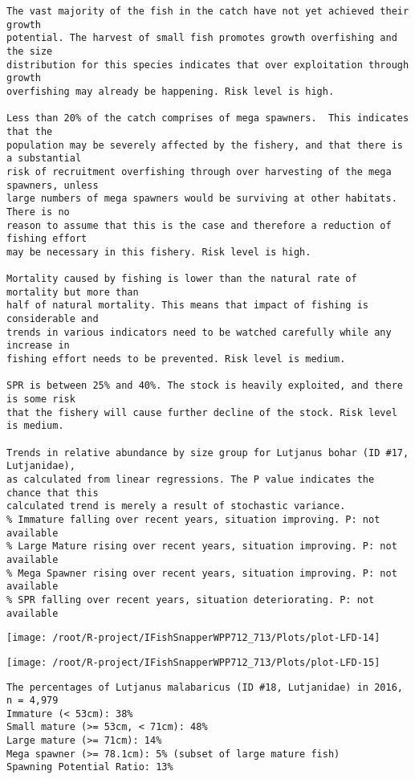 \documentclass{report}\usepackage[]{graphicx}\usepackage[]{color}
\makeatletter
\def\maxwidth{ %
  \ifdim\Gin@nat@width>\linewidth
    \linewidth
  \else
    \Gin@nat@width
  \fi
}
\newenvironment{kframe}{%
 \def\at@end@of@kframe{}%
 \ifinner\ifhmode%
  \def\at@end@of@kframe{\end{minipage}}%
  \begin{minipage}{\columnwidth}%
 \fi\fi%
 \def\FrameCommand##1{\hskip\@totalleftmargin \hskip-\fboxsep
 \colorbox{shadecolor}{##1}\hskip-\fboxsep
     \hskip-\linewidth \hskip-\@totalleftmargin \hskip\columnwidth}%
 \MakeFramed {\advance\hsize-\width
   \@totalleftmargin\z@ \linewidth\hsize
   \@setminipage}}%
 {\par\unskip\endMakeFramed%
 \at@end@of@kframe}
\newenvironment{knitrout}{}{} %
\makeatother
\begin{document}
\begin{knitrout}
\begin{kframe}
\begin{verbatim}
The vast majority of the fish in the catch have not yet achieved their growth
potential. The harvest of small fish promotes growth overfishing and the size
distribution for this species indicates that over exploitation through growth
overfishing may already be happening. Risk level is high.

Less than 20% of the catch comprises of mega spawners.  This indicates that the
population may be severely affected by the fishery, and that there is a substantial
risk of recruitment overfishing through over harvesting of the mega spawners, unless
large numbers of mega spawners would be surviving at other habitats. There is no
reason to assume that this is the case and therefore a reduction of fishing effort
may be necessary in this fishery. Risk level is high.
 
Mortality caused by fishing is lower than the natural rate of mortality but more than
half of natural mortality. This means that impact of fishing is considerable and
trends in various indicators need to be watched carefully while any increase in
fishing effort needs to be prevented. Risk level is medium.
 
SPR is between 25% and 40%. The stock is heavily exploited, and there is some risk
that the fishery will cause further decline of the stock. Risk level is medium.
 
Trends in relative abundance by size group for Lutjanus bohar (ID #17, Lutjanidae),
as calculated from linear regressions. The P value indicates the chance that this
calculated trend is merely a result of stochastic variance.
% Immature falling over recent years, situation improving. P: not available
% Large Mature rising over recent years, situation improving. P: not available
% Mega Spawner rising over recent years, situation improving. P: not available
% SPR falling over recent years, situation deteriorating. P: not available
\end{verbatim}
\end{kframe}
\texttt{[image: /root/R-project/IFishSnapperWPP712\_713/Plots/plot-LFD-14]} 

\texttt{[image: /root/R-project/IFishSnapperWPP712\_713/Plots/plot-LFD-15]} 
\begin{kframe}\begin{verbatim}
The percentages of Lutjanus malabaricus (ID #18, Lutjanidae) in 2016, n = 4,979
Immature (< 53cm): 38%
Small mature (>= 53cm, < 71cm): 48%
Large mature (>= 71cm): 14%
Mega spawner (>= 78.1cm): 5% (subset of large mature fish)
Spawning Potential Ratio: 13%
 

\end{verbatim}
\end{kframe}
\end{knitrout}
\end{document}
